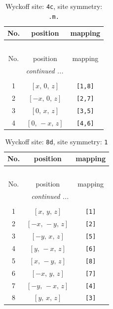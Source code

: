 \documentclass[fleqn,8pt]{jsarticle}
\begin{document}
\renewcommand{\arraystretch}{1.2}
\begin{longtable}{ccc}
\caption{Wyckoff site: {\tt 4c}, site symmetry: {\tt .m.}}
 \\
 \hline \hline
No. & position & mapping \\ \hline \endfirsthead

\multicolumn{2}{l}{\tablename\ \thetable{}} \\
 \hline \hline
No. & position & mapping \\ \hline \endhead

 \hline \hline
\multicolumn{2}{r}{\footnotesize\it continued ...} \\ \endfoot

 \hline \hline
\multicolumn{2}{r}{} \\ \endlastfoot

1 & $\left[ x,\, 0,\, z \right]$ & {\tt [1,8]} \\ \hline
2 & $\left[ - x,\, 0,\, z \right]$ & {\tt [2,7]} \\ \hline
3 & $\left[ 0,\, x,\, z \right]$ & {\tt [3,5]} \\ \hline
4 & $\left[ 0,\, - x,\, z \right]$ & {\tt [4,6]} \\
\end{longtable}
\renewcommand{\arraystretch}{1.2}
\begin{longtable}{ccc}
\caption{Wyckoff site: {\tt 8d}, site symmetry: {\tt 1}}
 \\
 \hline \hline
No. & position & mapping \\ \hline \endfirsthead

\multicolumn{2}{l}{\tablename\ \thetable{}} \\
 \hline \hline
No. & position & mapping \\ \hline \endhead

 \hline \hline
\multicolumn{2}{r}{\footnotesize\it continued ...} \\ \endfoot

 \hline \hline
\multicolumn{2}{r}{} \\ \endlastfoot

1 & $\left[ x,\, y,\, z \right]$ & {\tt [1]} \\ \hline
2 & $\left[ - x,\, - y,\, z \right]$ & {\tt [2]} \\ \hline
3 & $\left[ - y,\, x,\, z \right]$ & {\tt [5]} \\ \hline
4 & $\left[ y,\, - x,\, z \right]$ & {\tt [6]} \\ \hline
5 & $\left[ x,\, - y,\, z \right]$ & {\tt [8]} \\ \hline
6 & $\left[ - x,\, y,\, z \right]$ & {\tt [7]} \\ \hline
7 & $\left[ - y,\, - x,\, z \right]$ & {\tt [4]} \\ \hline
8 & $\left[ y,\, x,\, z \right]$ & {\tt [3]} \\
\end{longtable}
\end{document}
